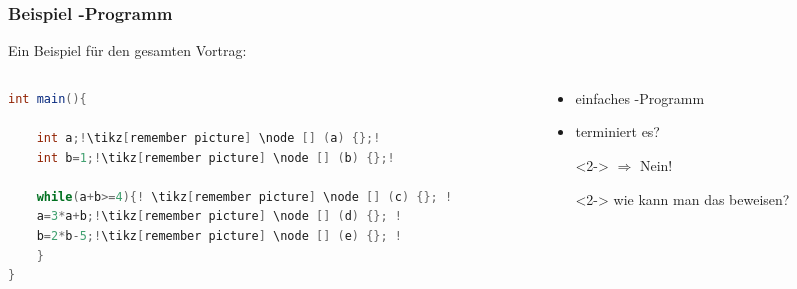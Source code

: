 
\begin{frame}[fragile] %
  \frametitle{Beispiel -Programm} %
  Ein Beispiel f\"ur den gesamten Vortrag:
  \begin{columns}
  	\begin{column}{6cm}
  		\begin{lstlisting}[language = java,escapechar = !]
int main(){
  		
	int a;!\tikz[remember picture] \node [] (a) {};!
	int b=1;!\tikz[remember picture] \node [] (b) {};!
  		
	while(a+b>=4){! \tikz[remember picture] \node [] (c) {}; !
    a=3*a+b;!\tikz[remember picture] \node [] (d) {}; !
    b=2*b-5;!\tikz[remember picture] \node [] (e) {}; !
	}
}		
  		\end{lstlisting}
%  		
%  		
  	\end{column}
	\begin{column}{5cm}
		\begin{itemize}			
			\item einfaches -Programm
			\item terminiert es?
			\item[]<2-> $\Rightarrow$ \color{red}Nein!\color{black}
			\item[]<2-> wie kann man das beweisen?
		\end{itemize}
	\end{column}
  \end{columns}
\end{frame}
